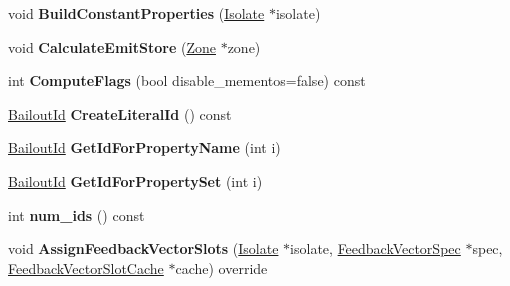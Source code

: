 \begin{DoxyCompactItemize}
\item 
void {\bfseries Build\+Constant\+Properties} (\hyperlink{classv8_1_1internal_1_1_isolate}{Isolate} $\ast$isolate)\hypertarget{classv8_1_1internal_1_1_object_literal_a29606b3de17393288a58c9b8df52e0c9}{}\label{classv8_1_1internal_1_1_object_literal_a29606b3de17393288a58c9b8df52e0c9}

\item 
void {\bfseries Calculate\+Emit\+Store} (\hyperlink{classv8_1_1internal_1_1_zone}{Zone} $\ast$zone)\hypertarget{classv8_1_1internal_1_1_object_literal_ac6e812cf743173ba0bb069b7adecacfb}{}\label{classv8_1_1internal_1_1_object_literal_ac6e812cf743173ba0bb069b7adecacfb}

\item 
int {\bfseries Compute\+Flags} (bool disable\+\_\+mementos=false) const \hypertarget{classv8_1_1internal_1_1_object_literal_afd3e46ba9ba7f04fea693fe3b60d3668}{}\label{classv8_1_1internal_1_1_object_literal_afd3e46ba9ba7f04fea693fe3b60d3668}

\item 
\hyperlink{classv8_1_1internal_1_1_bailout_id}{Bailout\+Id} {\bfseries Create\+Literal\+Id} () const \hypertarget{classv8_1_1internal_1_1_object_literal_a9d34afc17138bda7dfbf5ca768ae53bb}{}\label{classv8_1_1internal_1_1_object_literal_a9d34afc17138bda7dfbf5ca768ae53bb}

\item 
\hyperlink{classv8_1_1internal_1_1_bailout_id}{Bailout\+Id} {\bfseries Get\+Id\+For\+Property\+Name} (int i)\hypertarget{classv8_1_1internal_1_1_object_literal_a4f1a7ffbe4c22036f6e69d9cf84ff302}{}\label{classv8_1_1internal_1_1_object_literal_a4f1a7ffbe4c22036f6e69d9cf84ff302}

\item 
\hyperlink{classv8_1_1internal_1_1_bailout_id}{Bailout\+Id} {\bfseries Get\+Id\+For\+Property\+Set} (int i)\hypertarget{classv8_1_1internal_1_1_object_literal_ab82e63119c33504ee88cd6da3cb7bafd}{}\label{classv8_1_1internal_1_1_object_literal_ab82e63119c33504ee88cd6da3cb7bafd}

\item 
int {\bfseries num\+\_\+ids} () const \hypertarget{classv8_1_1internal_1_1_object_literal_accf33da2b68e327fb0fb43a9cc15a5e4}{}\label{classv8_1_1internal_1_1_object_literal_accf33da2b68e327fb0fb43a9cc15a5e4}

\item 
void {\bfseries Assign\+Feedback\+Vector\+Slots} (\hyperlink{classv8_1_1internal_1_1_isolate}{Isolate} $\ast$isolate, \hyperlink{classv8_1_1internal_1_1_feedback_vector_spec}{Feedback\+Vector\+Spec} $\ast$spec, \hyperlink{classv8_1_1internal_1_1_feedback_vector_slot_cache}{Feedback\+Vector\+Slot\+Cache} $\ast$cache) override\hypertarget{classv8_1_1internal_1_1_object_literal_af351bdf2be612a33e5d6ca07b38a9a9a}{}\label{classv8_1_1internal_1_1_object_literal_af351bdf2be612a33e5d6ca07b38a9a9a}

\end{DoxyCompactItemize}
